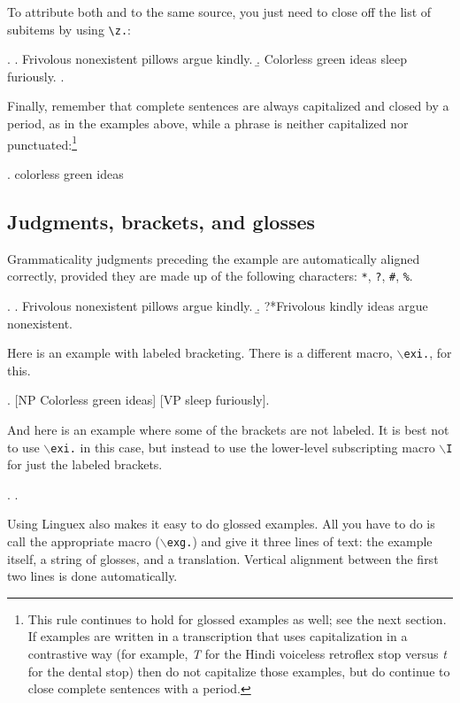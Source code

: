 \documentclass[letterpaper,12pt, twoside]{article}
\begin{document}
To attribute both \Last[a] and \Last[b] to the same source, you just need to close off the list of subitems by using \verb|\z.|:

\ex. 
\a. Frivolous nonexistent pillows argue kindly. 
\b. Colorless green ideas sleep furiously.
\z. \citep{journalarticle}

Finally, remember that complete sentences are always capitalized  and closed by a period, as in the examples above, while a phrase is neither capitalized nor punctuated:\footnote{This rule continues to hold for glossed examples as well; see the next section. If examples are written in a transcription that uses capitalization in a contrastive way (for example, \emph{T} for the Hindi voiceless retroflex stop versus \emph{t} for the dental stop) then do not capitalize those examples, but do continue to close complete sentences with a period.}

\ex. colorless green ideas


\subsection{Judgments, brackets, and glosses}\label{secjbg}



Grammaticality judgments preceding the example are automatically aligned correctly, provided they are made up of the following characters: \texttt{*}, \texttt{?}, \texttt{\#}, \texttt{\%}.

\ex. 
\a. Frivolous nonexistent pillows argue kindly.
\b. ?*Frivolous  kindly ideas argue nonexistent.


Here is an example with labeled bracketing. There is a different macro, \texttt{$\backslash$exi.}, for this.

\exi. [NP Colorless green ideas] [VP sleep furiously].

And here is an example where some of the brackets are not labeled. It is best not to use \texttt{$\backslash$exi.} in this case, but instead to use the lower-level subscripting macro \texttt{$\backslash$I} for just the labeled brackets.

\ex. . 


Using {Linguex} also makes it easy to do glossed examples. All you have to do is call the appropriate macro (\texttt{$\backslash$exg.}) and give it three lines of text: the example itself, a string of glosses, and a translation. Vertical alignment between the first two lines is done automatically. 
\end{document}
